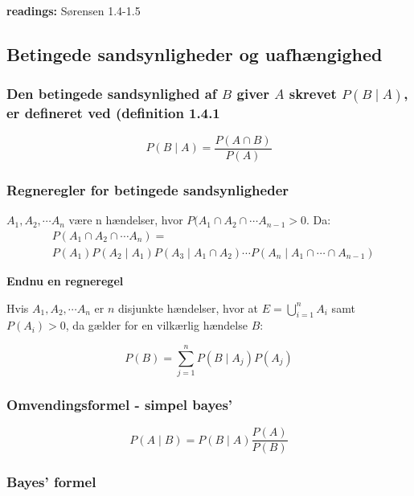 \textbf{readings:} Sørensen 1.4-1.5

\subsection{Betingede sandsynligheder og uafhængighed}

\subsubsection{Den betingede sandsynlighed af $B$ giver $A$ skrevet $P(B\mid A)$, er defineret ved (definition 1.4.1}

\begin{equation}
    P(B\mid A) = \frac{P(A\cap B)}{P(A)}
\end{equation}

\subsubsection{Regneregler for betingede sandsynligheder}

$A_1, A_2, \cdots A_n$ være n hændelser, hvor $P(A_1 \cap A_2 \cap \cdots A_{n-1}>0$. Da:
\begin{align}
    &P(A_1 \cap A_2 \cap \cdots A_n) = \\ &P(A_{1})P(A_2\mid A_1)P(A_3\mid A_1 \cap A_2) \cdots P(A_n \mid A_1 \cap \cdots \cap A_{n-1})
\end{align}

\textbf{Endnu en regneregel}

Hvis $A_1, A_2, \cdots A_n$ er $n$ disjunkte hændelser, hvor at $E = \bigcup_{i=1}^n A_i$ samt $P(A_i)>0$, da gælder for en vilkærlig hændelse $B$:

\begin{equation}
    P(B) = \sum_{j=1}^n P(B\mid A_j)P(A_j)
\end{equation}

\subsubsection{Omvendingsformel - simpel bayes'}

\begin{equation}
    P(A\mid B) = P(B \mid A) \frac{P(A)}{P(B)}
\end{equation}

\subsubsection{Bayes' formel}

